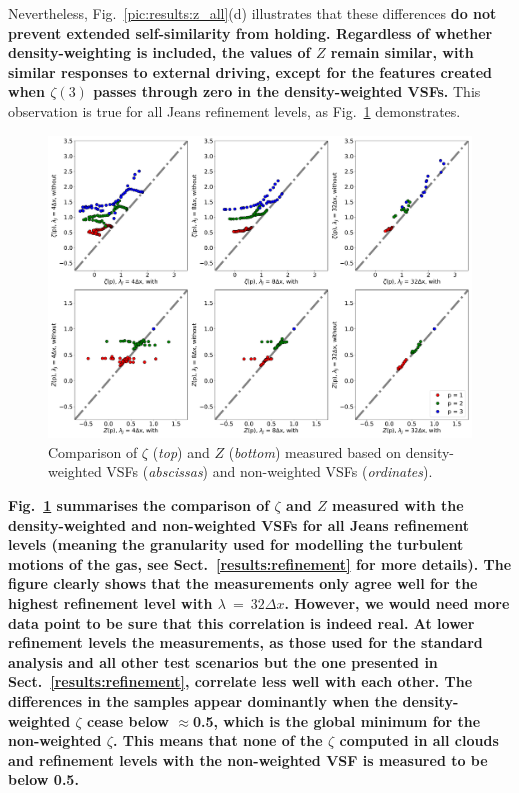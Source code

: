 Nevertheless, Fig.~\ref{pic:results:z_all}(d) illustrates that these differences \textbf{do not prevent extended self-similarity from holding. 
Regardless of whether density-weighting is included, the values of $Z$ remain similar, with similar responses to external driving, except for the features created when $\zeta(3)$ passes through zero in the density-weighted VSFs.}
This observation is true for all Jeans refinement levels, as Fig.~\ref{pic:results:comp_weighting} demonstrates.


\begin{figure}
	\centering
    \includegraphics[width=\textwidth]{comp_weighting.pdf}
    \caption{ Comparison of $\zeta$ (\textit{top}) and $Z$ (\textit{bottom}) measured based on density-weighted VSFs (\textit{abscissas}) and non-weighted VSFs (\textit{ordinates}). }
    \label{pic:results:comp_weighting}
\end{figure}

\textbf{Fig.~\ref{pic:results:comp_weighting} summarises the comparison of $\zeta$ and $Z$ measured with the density-weighted and non-weighted VSFs for all Jeans refinement levels (meaning the granularity used for modelling the turbulent motions of the gas, see Sect.~\ref{results:refinement} for more details).
The figure clearly shows that the measurements only agree well for the highest refinement level with $\lambda~=~32\Delta x$.
However, we would need more data point to be sure that this correlation is indeed real.
At lower refinement levels the measurements, as those used for the standard analysis and all other test scenarios but the one presented in Sect.~\ref{results:refinement}, correlate less well with each other. 
The differences in the samples appear dominantly when the density-weighted $\zeta$ cease below $\approx$0.5, which is the global minimum for the non-weighted $\zeta$. 
This means that none of the $\zeta$ computed in all clouds and refinement levels with the non-weighted VSF is measured to be below 0.5. }

